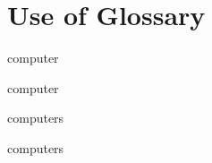 \chapter{Use of Glossary}

\gls{computer} %

\Gls{computer} %

\glspl{computer} %

\Glspl{computer} %
